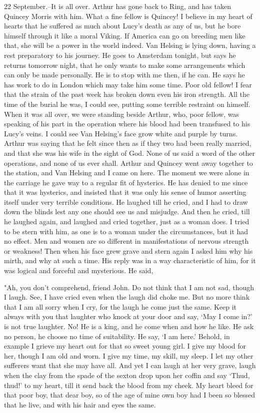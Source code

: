 22 September.--It is all over. Arthur has gone back to Ring, and has taken Quincey Morris with him. What a fine fellow is Quincey! I believe in my heart of hearts that he suffered as much about Lucy's death as any of us, but he bore himself through it like a moral Viking. If America can go on breeding men like that, she will be a power in the world indeed. Van Helsing is lying down, having a rest preparatory to his journey. He goes to Amsterdam tonight, but says he returns tomorrow night, that he only wants to make some arrangements which can only be made personally. He is to stop with me then, if he can. He says he has work to do in London which may take him some time. Poor old fellow! I fear that the strain of the past week has broken down even his iron strength. All the time of the burial he was, I could see, putting some terrible restraint on himself. When it was all over, we were standing beside Arthur, who, poor fellow, was speaking of his part in the operation where his blood had been transfused to his Lucy's veins. I could see Van Helsing's face grow white and purple by turns. Arthur was saying that he felt since then as if they two had been really married, and that she was his wife in the sight of God. None of us said a word of the other operations, and none of us ever shall. Arthur and Quincey went away together to the station, and Van Helsing and I came on here. The moment we were alone in the carriage he gave way to a regular fit of hysterics. He has denied to me since that it was hysterics, and insisted that it was only his sense of humor asserting itself under very terrible conditions. He laughed till he cried, and I had to draw down the blinds lest any one should see us and misjudge. And then he cried, till he laughed again, and laughed and cried together, just as a woman does. I tried to be stern with him, as one is to a woman under the circumstances, but it had no effect. Men and women are so different in manifestations of nervous strength or weakness! Then when his face grew grave and stern again I asked him why his mirth, and why at such a time. His reply was in a way characteristic of him, for it was logical and forceful and mysterious. He said, 

"Ah, you don't comprehend, friend John. Do not think that I am not sad, though I laugh. See, I have cried even when the laugh did choke me. But no more think that I am all sorry when I cry, for the laugh he come just the same. Keep it always with you that laughter who knock at your door and say, `May I come in?' is not true laughter. No! He is a king, and he come when and how he like. He ask no person, he choose no time of suitability. He say, `I am here.' Behold, in example I grieve my heart out for that so sweet young girl. I give my blood for her, though I am old and worn. I give my time, my skill, my sleep. I let my other sufferers want that she may have all. And yet I can laugh at her very grave, laugh when the clay from the spade of the sexton drop upon her coffin and say `Thud, thud!' to my heart, till it send back the blood from my cheek. My heart bleed for that poor boy, that dear boy, so of the age of mine own boy had I been so blessed that he live, and with his hair and eyes the same. 

